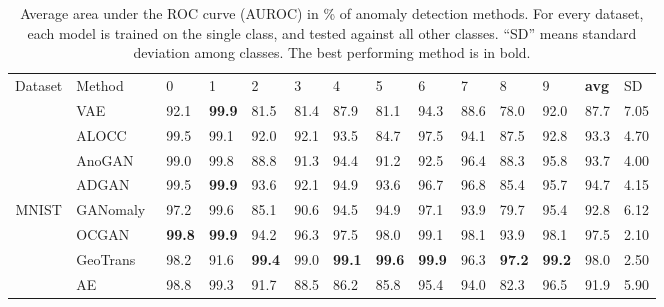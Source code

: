 \documentclass[journal]{IEEEtran}
\begin{document}
\renewcommand \arraystretch{0.95}
\begin{table*}[!htb]
\centering
\caption{Average area under the ROC curve (AUROC) in \% of anomaly detection methods. For every dataset, each model is trained on the single class, and tested against all other classes. ``SD'' means standard deviation among classes. The best performing method is in bold.}
	\footnotesize
	\begin{minipage}[t]{0.95\textwidth}
	\begin{tabular}{cx{2.0cm}x{0.6cm}x{0.6cm}x{0.6cm}x{0.6cm}x{0.6cm}x{0.6cm}x{0.6cm}x{0.6cm}x{0.6cm}x{0.6cm}x{0.6cm}x{0.8cm}}
	\toprule
	Dataset & Method & 0 & 1 & 2 & 3 & 4 & 5 & 6 & 7 & 8 & 9 & \textbf{avg} & SD\\
	\cmidrule(lr){1-1} \cmidrule(lr){2-2} \cmidrule(lr){3-3} \cmidrule(lr){4-4} \cmidrule(lr){5-5} \cmidrule(lr){6-6} \cmidrule(lr){7-7} \cmidrule(lr){8-8} \cmidrule(lr){9-9} \cmidrule(lr){10-10} \cmidrule(lr){11-11} \cmidrule(lr){12-12} \cmidrule(lr){13-13} \cmidrule(lr){14-14}
		& VAE~\cite{kingma2013auto} 
		& 92.1 & \textbf{99.9} & 81.5 & 81.4 & 87.9 & 81.1 & 94.3 & 88.6 & 78.0 & 92.0 & 87.7 & 7.05\\
		& ALOCC~\cite{Sabokrou2018Adversarially}
		& 99.5 & 99.1 & 92.0 & 92.1 & 93.5 & 84.7 & 97.5 & 94.1 & 87.5 & 92.8 & 93.3 & 4.70\\
		& AnoGAN~\cite{schlegl2017unsupervised} 
		& 99.0 & 99.8 & 88.8 & 91.3 & 94.4 & 91.2 & 92.5 & 96.4 & 88.3 & 95.8 & 93.7 & 4.00\\
		& ADGAN~\cite{deecke2018image} 
		& 99.5 & \textbf{99.9} & 93.6 & 92.1 & 94.9 & 93.6 & 96.7 & 96.8 & 85.4 & 95.7 & 94.7 & 4.15\\
		MNIST& GANomaly~\cite{Akcay2018} 
		& 97.2 & 99.6 & 85.1 & 90.6 & 94.5 & 94.9 & 97.1 & 93.9 & 79.7 & 95.4 & 92.8 & 6.12\\
		& OCGAN~\cite{perera2019ocgan} 
		& \textbf{99.8} & \textbf{99.9} & 94.2 & 96.3 & 97.5 & 98.0 & 99.1 & 98.1 & 93.9 & 98.1 & 97.5 & 2.10\\
		& GeoTrans~\cite{golan2018deep} 
		& 98.2 & 91.6 & \textbf{99.4} & 99.0 & \textbf{99.1} & \textbf{99.6} & \textbf{99.9} & 96.3 & \textbf{97.2} & \textbf{99.2} & 98.0 & 2.50\\
		\cmidrule(lr){2-2} \cmidrule(lr){3-3} \cmidrule(lr){4-4} \cmidrule(lr){5-5} \cmidrule(lr){6-6} \cmidrule(lr){7-7} \cmidrule(lr){8-8} \cmidrule(lr){9-9} \cmidrule(lr){10-10} \cmidrule(lr){11-11} \cmidrule(lr){12-12} \cmidrule(lr){13-13} \cmidrule(lr){14-14}
		& AE & 98.8 & 99.3 & 91.7 & 88.5 & 86.2 & 85.8 & 95.4 & 94.0 & 82.3 & 96.5 & 91.9 & 5.90\\

\end{tabular}
\end{minipage}
\end{table*}
\end{document}
